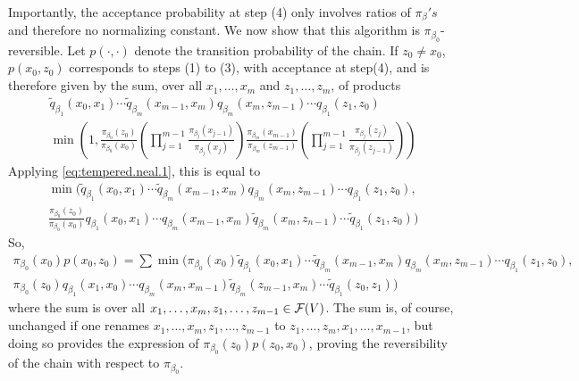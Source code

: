 \begin{enumerate}[label={\bf \alph*.}]
Importantly, the acceptance probability at step (4) only involves ratios of $\pi_\beta's$ and therefore no normalizing constant.
We now show that this algorithm is $\pi_{\beta_0}$-reversible. Let $p(\cdot, \cdot)$ denote the transition probability of the chain. If $z_0\neq x_0$,  $p(x_0, z_0)$ corresponds to steps (1) to (3), with acceptance at step(4), and is therefore given by the sum, over all  $x_1, \ldots, x_m$ and $z_1, \ldots, z_m$, of products 
\begin{multline*}
\tilde q_{\beta_{1}}(x_{0}, x_1)\cdots \tilde q_{\beta_{m}}(x_{m-1}, x_m) q_{\beta_{m}}(x_{m}, z_{m-1}) \cdots q_{\beta_{1}}(z_{1}, z_0) \\
\min\left(1, \frac{\pi_{\beta_0}(z_0)}{\pi_{\beta_0}(x_0)}
\left(\prod_{j=1}^{m-1}  \frac{\pi_{\beta_j}(x_{j-1})}{\pi_{\beta_{j}}(x_{j})}\right) \frac{\pi_{\beta_{m}}(x_{m-1})}{\pi_{\beta_{m}}(z_{m-1})}
\left(
\prod_{j=1}^{m-1}  \frac{\pi_{\beta_{j}}(z_{j})}{\pi_{\beta_{j}}(z_{j-1})}
\right)\right)
\end{multline*}
Applying \cref{eq:tempered.neal.1}, this is equal to
\begin{multline*}
\min\Big(
\tilde q_{\beta_{1}}(x_{0}, x_1)\cdots \tilde q_{\beta_{m}}(x_{m-1}, x_m) q_{\beta_{m}}(x_{m}, z_{m-1}) \cdots q_{\beta_{1}}(z_{1}, z_0),\\ \frac{\pi_{\beta_0}(z_0)}{\pi_{\beta_0}(x_0)}
q_{\beta_{1}}(x_{0}, x_1)\cdots  q_{\beta_{m}}(x_{m-1}, x_m) \tilde q_{\beta_{m}}(x_{m}, z_{n-1}) \cdots \tilde q_{\beta_{1}}(z_{1}, z_0) \Big)
\end{multline*}
So,
\begin{multline*}
\pi_{\beta_0}(x_0) p(x_0, z_0) = \sum \min\Big(\pi_{\beta_0}(x_0)
\tilde q_{\beta_{1}}(x_{0}, x_1)\cdots \tilde q_{\beta_{m}}(x_{m-1}, x_m) q_{\beta_{m}}(x_{m}, z_{m-1}) \cdots q_{\beta_{1}}(z_{1}, z_0),\\ \pi_{\beta_0}(z_0)
q_{\beta_{1}}(x_{1}, x_0)\cdots  q_{\beta_{m}}(x_{m}, x_{m-1}) \tilde q_{\beta_{m}}(z_{m-1}, x_m) \cdots \tilde q_{\beta_{1}}(z_{0}, z_1) \Big)
\end{multline*}
where the sum is over all $x_1, \ldots, x_m, z_1, \ldots, z_{m-1}\in {\mathcal F}(V)$. The sum is, of course, unchanged if one renames $x_1, \ldots, x_m, z_1, \ldots, z_{m-1}$ to $z_1, \ldots, z_m, x_1, \ldots, x_{m-1}$, but doing so provides the expression of  $\pi_{\beta_0}(z_0) p(z_0, x_0)$, proving the reversibility of the chain with respect to $\pi_{\beta_0}$.



\end{enumerate}

